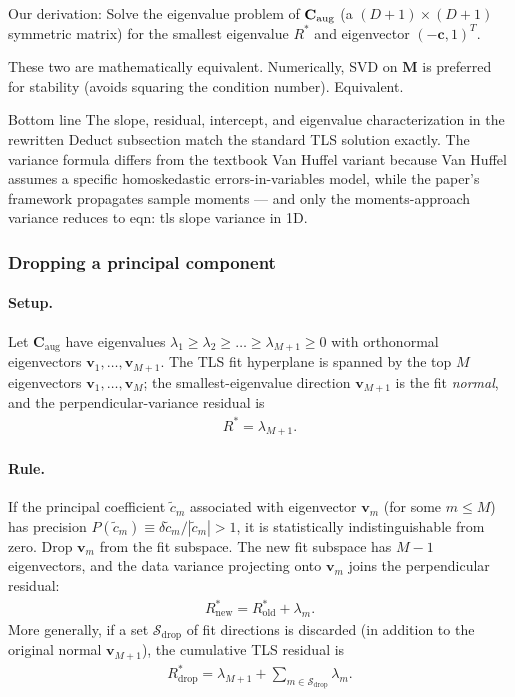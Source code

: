 \documentclass[twoside]{article}
\numberwithin{equation}{section}
\begin{document}
Our derivation: Solve the eigenvalue problem of $\mathbf{C}_{\rm aug}$ (a $(D+1) \times (D+1)$ symmetric matrix) for the smallest eigenvalue $R^*$ and eigenvector $(-\mathbf{c}, 1)^T$.

These two are mathematically equivalent. Numerically, SVD on $\mathbf{M}$ is preferred for stability (avoids squaring the condition number).  Equivalent.

Bottom line
The slope, residual, intercept, and eigenvalue characterization in the rewritten Deduct subsection match the standard TLS solution exactly. The variance formula differs from the textbook Van Huffel variant because Van Huffel assumes a specific homoskedastic errors-in-variables model, while the paper's framework propagates sample moments — and only the moments-approach variance reduces to eqn: tls slope variance in 1D.



\subsubsection{Dropping a principal component}

\paragraph{Setup.}
Let $\mathbf{C}_{\mathrm{aug}}$ have eigenvalues $\lambda_1 \geq \lambda_2 \geq \dots \geq \lambda_{M+1} \geq 0$ with orthonormal eigenvectors $\mathbf{v}_1, \dots, \mathbf{v}_{M+1}$. The TLS fit hyperplane is spanned by the top $M$ eigenvectors $\mathbf{v}_1, \dots, \mathbf{v}_M$; the smallest-eigenvalue direction $\mathbf{v}_{M+1}$ is the fit \emph{normal}, and the perpendicular-variance residual is
\begin{align*}
R^* = \lambda_{M+1}.
\end{align*}

\paragraph{Rule.}
If the principal coefficient $\tilde{c}_m$ associated with eigenvector $\mathbf{v}_m$ (for some $m \leq M$) has precision $P(\tilde{c}_m) \equiv \delta \tilde{c}_m / |\tilde{c}_m| > 1$, it is statistically indistinguishable from zero. Drop $\mathbf{v}_m$ from the fit subspace. The new fit subspace has $M - 1$ eigenvectors, and the data variance projecting onto $\mathbf{v}_m$ joins the perpendicular residual:
\begin{align}
\label{eqn: pcr drop rule}
R^*_{\mathrm{new}} = R^*_{\mathrm{old}} + \lambda_m.
\end{align}
More generally, if a set $\mathcal{S}_{\mathrm{drop}}$ of fit directions is discarded (in addition to the original normal $\mathbf{v}_{M+1}$), the cumulative TLS residual is
\begin{align*}
R^*_{\mathrm{drop}} = \lambda_{M+1} + \sum_{m \in \mathcal{S}_{\mathrm{drop}}} \lambda_m.
\end{align*}
\end{document}
